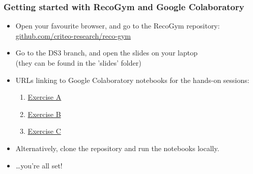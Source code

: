 \begin{frame}
  \frametitle{Getting started with RecoGym and Google Colaboratory}
  \begin{itemize}
    \item Open your favourite browser, and go to the RecoGym repository: \url{github.com/criteo-research/reco-gym}\vspace{3mm}
    \item Go to the DS3 branch, and open the slides on your laptop\\(they can be found in the 'slides' folder)\vspace{3mm}
    \item  URLs linking to Google Colaboratory notebooks for the hands-on sessions:
        \begin{enumerate}
            \item \href{https://colab.research.google.com/github/criteo-research/reco-gym/blob/DS3/Module\%20III\%20A.ipynb}{Exercise A}
            \item \href{https://colab.research.google.com/github/criteo-research/reco-gym/blob/DS3/Module\%20III\%20B.ipynb}{Exercise B}
            \item \href{https://colab.research.google.com/github/criteo-research/reco-gym/blob/DS3/Module\%20III\%20C.ipynb}{Exercise C}
        \end{enumerate}
    \item Alternatively, clone the repository and run the notebooks locally.\vspace{3mm}
    \item \ldots you're all set!
  \end{itemize}
\end{frame}
